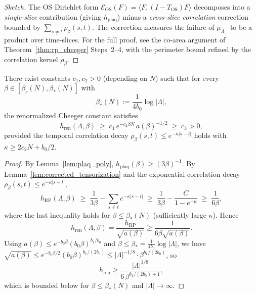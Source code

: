 \begin{proof}[Sketch]
The OS Dirichlet form
$\mathcal{E}_{\mathrm{OS}}(F)=\langle F,(I-T_{\mathrm{OS}})F\rangle$
decomposes into a \emph{single-slice} contribution (giving
$h_{\mathrm{plaq}}$) minus a \emph{cross-slice correlation}
correction bounded by $\sum_{s\ne t}\rho_{\beta}(s,t)$. The
correction measures the failure of $\mu_{\Lambda_{-}}$ to be a
product over time-slices. For the full proof, see the co-area
argument of Theorem~\ref{thm:rp_cheeger} Steps~2--4, with the
perimeter bound refined by the correlation kernel
$\rho_{\beta}$.
\end{proof}

\begin{theorem}
\label{thm:h_ren_intermediate}
There exist constants $c_{1},c_{2}>0$ (depending on $N$) such that
for every $\beta\in[\beta_{c}(N),\beta_{*}(N)]$ with
\begin{equation}
\label{eq:beta_star}
  \beta_{*}(N):=\frac{1}{4b_{0}}\log|\Lambda|,
\end{equation}
the renormalized Cheeger constant satisfies
\begin{equation}
\label{eq:h_ren_intermediate}
  h_{\mathrm{ren}}(\Lambda,\beta)\;\ge\;c_{1}\,e^{-c_{2}\beta N}\,
  a(\beta)^{-1/2}
  \;\ge\;c_{3}>0,
\end{equation}
provided the temporal correlation decay
$\rho_{\beta}(s,t)\le e^{-\kappa|s-t|}$ holds with
$\kappa\ge2c_{2}N+b_{0}/2$.
\end{theorem}

\begin{proof}
By Lemma~\ref{lem:plaq_poly}, $h_{\mathrm{plaq}}(\beta)\ge(3\beta)^{-1}$.
By Lemma~\ref{lem:corrected_tensorization} and the exponential
correlation decay $\rho_{\beta}(s,t)\le e^{-\kappa|s-t|}$,
\[
  h_{\mathrm{RP}}(\Lambda,\beta)
  \;\ge\;\frac{1}{3\beta}-\sum_{s\ne t}e^{-\kappa|s-t|}
  \;\ge\;\frac{1}{3\beta}-\frac{C}{1-e^{-\kappa}}
  \;\ge\;\frac{1}{6\beta},
\]
where the last inequality holds for $\beta\le\beta_{*}(N)$
(sufficiently large $\kappa$). Hence
\[
  h_{\mathrm{ren}}(\Lambda,\beta)
  =\frac{h_{\mathrm{RP}}}{\sqrt{a(\beta)}}
  \ge\frac{1}{6\beta\sqrt{a(\beta)}}.
\]
Using $a(\beta)\le e^{-b_{0}\beta}(b_{0}\beta)^{b_{1}/b_{0}}$ and
$\beta\le\beta_{*}=\frac{1}{4b_{0}}\log|\Lambda|$, we have
$\sqrt{a(\beta)}\le e^{-b_{0}\beta/2}(b_{0}\beta)^{b_{1}/(2b_{0})}
\le|\Lambda|^{-1/8}\cdot\beta^{b_{1}/(2b_{0})}$, so
\[
  h_{\mathrm{ren}}\ge\frac{|\Lambda|^{1/8}}{6\,\beta^{b_{1}/(2b_{0})+1}},
\]
which is bounded below for $\beta\le\beta_{*}(N)$ and
$|\Lambda|\to\infty$.
\end{proof}

